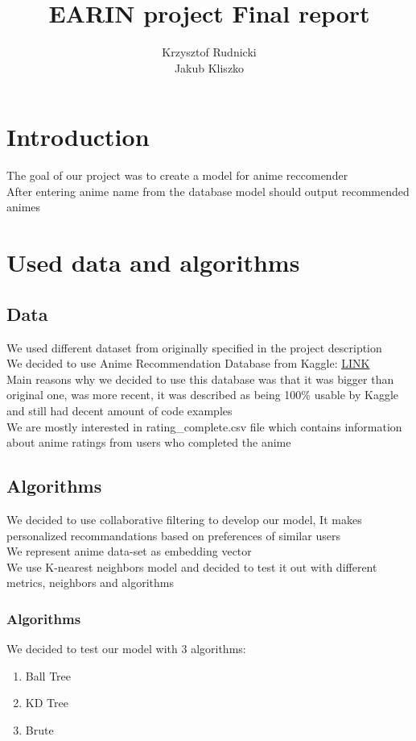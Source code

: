 \documentclass[12pt]{article}
\title{EARIN project Final report}
\author{Krzysztof Rudnicki \\ Jakub Kliszko}
\begin{document}
\maketitle
\section{Introduction}
The goal of our project was to create a model for anime reccomender \\ 
After entering anime name from the database model should output recommended animes 
\section{Used data and algorithms}
\subsection{Data}
We used different dataset from originally specified in the project description \\ 
We decided to use Anime Recommendation Database from Kaggle: \href{https://www.kaggle.com/datasets/hernan4444/anime-recommendation-database-2020}{LINK} \\ 
Main reasons why we decided to use this database was that it was bigger than original one, was more recent, it was described as being 100\% usable by Kaggle and still had decent amount of code examples \\ 
We are mostly interested in rating\_complete.csv file which contains information about anime ratings from users who completed the anime 
\subsection{Algorithms}
We decided to use collaborative filtering to develop our model, It makes personalized recommandations based on preferences of similar users \\ 
We represent anime data-set as embedding vector \\ 
We use K-nearest neighbors model and decided to test it out with different metrics, neighbors and algorithms \\ 
\subsubsection{Algorithms}
We decided to test our model with 3 algorithms:
\begin{enumerate}
  \item Ball Tree
  \item KD Tree 
  \item Brute
\end{enumerate}
\end{document}
